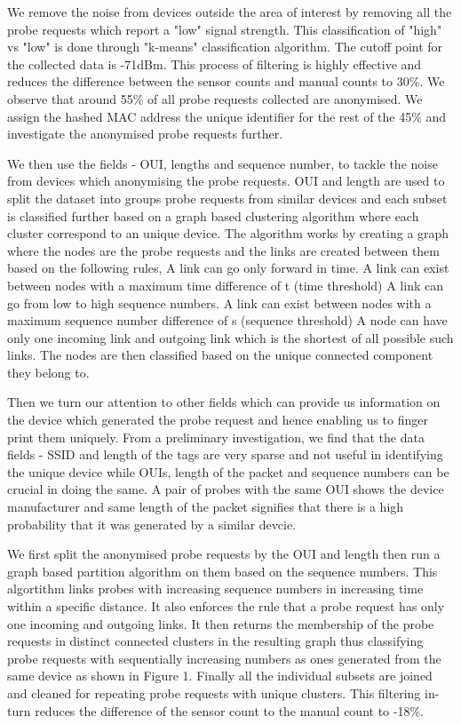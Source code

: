 \documentclass[11t, a4paper, twocolumn]{article}
\begin{document}
	We remove the noise from devices outside the area of interest 
	by removing all the probe requests which report a "low" signal strength.
	This classification of "high" vs "low" is done through "k-means"
	classification algorithm.
	The cutoff point for the collected data is -71dBm.
	This process of filtering is highly effective and reduces the difference
	between the sensor counts and manual counts to 30\%. We observe that
	around 55\% of all probe requests collected are anonymised.
	We assign the hashed MAC address the unique identifier for the rest of
	the 45\% and investigate the anonymised probe requests further.
	
	We then use the fields - OUI, lengths and sequence number,
	to tackle the noise from devices which anonymising the probe requests.
	OUI and length are used to split the dataset into
	groups probe requests from similar
	devices and each subset is classified further
	based on a graph based clustering algorithm 
	where each cluster correspond to an unique device.
	The algorithm works by creating a graph where the nodes are the
	probe requests and the links are created between them based on the following
	rules,
	A link can go only forward in time.
	A link can exist between nodes with a 
		maximum time difference of t (time threshold)
	A link can go from low to high sequence numbers.
	A link can exist between nodes with a
		maximum sequence number difference of s (sequence threshold)
	A node can have only one incoming link and outgoing link
		which is the shortest of all possible such links.
	The nodes are then classified based on the unique connected component they
	belong to.

	Then we turn our attention to other fields which can provide us information
	on the device which generated the probe request and hence enabling us to 
	finger print them uniquely.
	From a preliminary investigation, we find that the data fields - SSID and length of
	the tags are very sparse and not useful in identifying the unique device while 
	OUIs, length of the packet and sequence numbers can be crucial in doing the same.
	A pair of probes with the same OUI shows the device manufacturer and same length of the packet signifies that 
	there is a high probability that it was generated by a similar devcie.
	
	We first split the anonymised probe requests by the OUI and length then run a 
	graph based partition algorithm on them based on the sequence numbers. This 
	algortithm links probes with increasing sequence numbers in increasing time within a
	specific distance. It also enforces the rule that a probe request has only one 
	incoming and outgoing links. It then returns the membership of the probe requests in
	distinct connected clusters in the resulting graph thus classifying probe requests
	with sequentially increasing numbers as ones generated from the same device as shown in Figure 1. Finally
	all the individual subsets are joined and cleaned for repeating probe requests with
	unique clusters. This filtering in-turn reduces the difference of the sensor count to the manual count to 
	-18\%.
\end{document}
